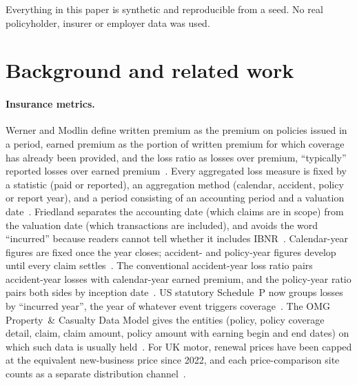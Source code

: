 \documentclass[11pt]{article}
\begin{document}
Everything in this paper is synthetic and reproducible from a seed. No real policyholder, insurer or employer
data was used.

\section{Background and related work}\label{sec:background}

\paragraph{Insurance metrics.}
Werner and Modlin define written premium as the premium on policies issued in a period, earned premium as the
portion of written premium for which coverage has already been provided, and the loss ratio as losses over
premium, ``typically'' reported losses over earned premium~\cite[pp.~2--9]{werner2016basic}. Every aggregated
loss measure is fixed by a statistic (paid or reported), an aggregation method (calendar, accident, policy or
report year), and a period consisting of an accounting period and a valuation
date~\cite[p.~91]{werner2016basic}. Friedland separates the accounting date (which claims are in scope) from the
valuation date (which transactions are included), and avoids the word ``incurred'' because readers cannot tell
whether it includes IBNR~\cite[pp.~15, 38--39]{friedland2010estimating}. Calendar-year figures are fixed once
the year closes; accident- and policy-year figures develop until every claim
settles~\cite[pp.~42--43]{werner2016basic}. The conventional accident-year loss ratio pairs accident-year losses
with calendar-year earned premium, and the policy-year ratio pairs both sides by inception
date~\cite[p.~43]{werner2016basic}. US statutory Schedule~P now groups losses by ``incurred year'', the year
of whatever event triggers coverage~\cite{naic2025bwg07}. The OMG Property~\& Casualty Data Model gives the
entities (policy, policy coverage detail, claim, claim amount, policy amount with earning begin and end dates) on
which such data is usually held~\cite{omg2014pc}. For UK motor, renewal prices have been capped at the equivalent
new-business price since 2022, and each price-comparison site counts as a separate distribution
channel~\cite{fca2021ps215}.
\end{document}
